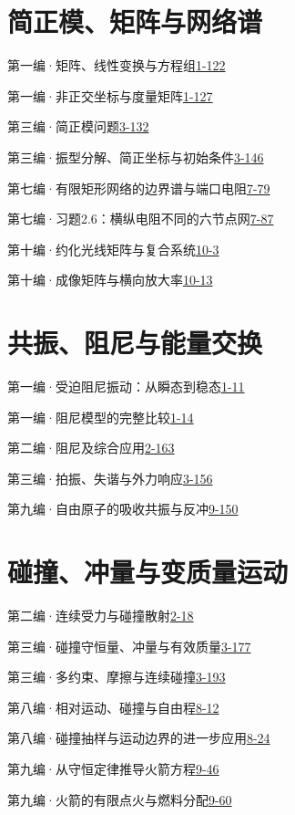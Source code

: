 \section*{简正模、矩阵与网络谱}
\noindent 第一编·矩阵、线性变换与方程组\quad\href{course-page:1:127}{1-122}\par
\noindent 第一编·非正交坐标与度量矩阵\quad\href{course-page:1:132}{1-127}\par
\noindent 第三编·简正模问题\quad\href{course-page:3:135}{3-132}\par
\noindent 第三编·振型分解、简正坐标与初始条件\quad\href{course-page:3:149}{3-146}\par
\noindent 第七编·有限矩形网络的边界谱与端口电阻\quad\href{course-page:7:82}{7-79}\par
\noindent 第七编·习题2.6：横纵电阻不同的六节点网\quad\href{course-page:7:90}{7-87}\par
\noindent 第十编·约化光线矩阵与复合系统\quad\href{course-page:10:7}{10-3}\par
\noindent 第十编·成像矩阵与横向放大率\quad\href{course-page:10:17}{10-13}\par
\section*{共振、阻尼与能量交换}
\noindent 第一编·受迫阻尼振动：从瞬态到稳态\quad\href{course-page:1:16}{1-11}\par
\noindent 第一编·阻尼模型的完整比较\quad\href{course-page:1:19}{1-14}\par
\noindent 第二编·阻尼及综合应用\quad\href{course-page:2:165}{2-163}\par
\noindent 第三编·拍振、失谐与外力响应\quad\href{course-page:3:159}{3-156}\par
\noindent 第九编·自由原子的吸收共振与反冲\quad\href{course-page:9:154}{9-150}\par
\section*{碰撞、冲量与变质量运动}
\noindent 第二编·连续受力与碰撞散射\quad\href{course-page:2:20}{2-18}\par
\noindent 第三编·碰撞守恒量、冲量与有效质量\quad\href{course-page:3:180}{3-177}\par
\noindent 第三编·多约束、摩擦与连续碰撞\quad\href{course-page:3:196}{3-193}\par
\noindent 第八编·相对运动、碰撞与自由程\quad\href{course-page:8:15}{8-12}\par
\noindent 第八编·碰撞抽样与运动边界的进一步应用\quad\href{course-page:8:27}{8-24}\par
\noindent 第九编·从守恒定律推导火箭方程\quad\href{course-page:9:50}{9-46}\par
\noindent 第九编·火箭的有限点火与燃料分配\quad\href{course-page:9:64}{9-60}\par
